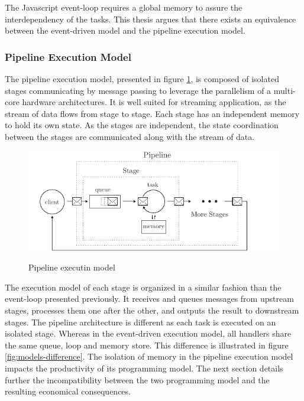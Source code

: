 The Javascript event-loop requires a global memory to assure the interdependency of the tasks.
This thesis argues that there exists an equivalence between the event-driven model and the pipeline execution model.

\subsubsection{Pipeline Execution Model}

The pipeline execution model, presented in figure \ref{fig:pipeline}, is composed of isolated stages communicating by message passing to leverage the parallelism of a multi-core hardware architectures.
It is well suited for streaming application, as the stream of data flows from stage to stage.
Each stage has an independent memory to hold its own state.
As the stages are independent, the state coordination between the stages are communicated along with the stream of data.

\begin{figure}[h!]
  \centering
  \includegraphics[width=0.8\linewidth]{../resources/pipeline.pdf}
  \label{fig:pipeline}
  \caption{Pipeline executin model}
\end{figure}

The execution model of each stage is organized in a similar fashion than the event-loop presented previously.
It receives and queues messages from upstream stages, processes them one after the other, and outputs the result to downstream stages.
The pipeline architecture is different as each task is executed on an isolated stage.
Whereas in the event-driven execution model, all handlers share the same queue, loop and memory store.
This difference is illustrated in figure \ref{fig:models-difference}.
The isolation of memory in the pipeline execution model impacts the productivity of its programming model.
The next section details further the incompatibility between the two programming model and the resulting economical consequences.

